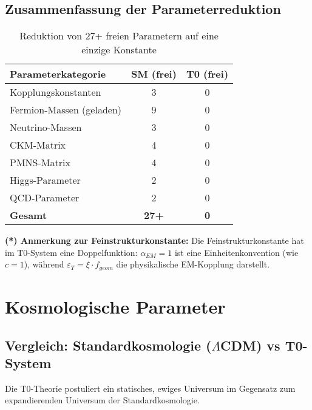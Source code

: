 \documentclass[12pt,a4paper]{article}
\begin{document}
	\subsection{Zusammenfassung der Parameterreduktion}
	
	\begin{table}[H]
		\centering
		\begin{tabular}{lcc}
			\toprule
			\textbf{Parameterkategorie} & \textbf{SM (frei)} & \textbf{T0 (frei)} \\
			\midrule
			Kopplungskonstanten & 3 & 0 \\
			Fermion-Massen (geladen) & 9 & 0 \\
			Neutrino-Massen & 3 & 0 \\
			CKM-Matrix & 4 & 0 \\
			PMNS-Matrix & 4 & 0 \\
			Higgs-Parameter & 2 & 0 \\
			QCD-Parameter & 2 & 0 \\
			\midrule
			\textbf{Gesamt} & \textbf{27+} & \textbf{0} \\
			\bottomrule
		\end{tabular}
		\caption{Reduktion von 27+ freien Parametern auf eine einzige Konstante}
	\end{table}
	
	\textbf{(*) Anmerkung zur Feinstrukturkonstante:}
	Die Feinstrukturkonstante hat im T0-System eine Doppelfunktion: $\alpha_{EM} = 1$ ist eine Einheitenkonvention (wie $c = 1$), während $\varepsilon_T = \xi \cdot f_{geom}$ die physikalische EM-Kopplung darstellt.
	
	\section{Kosmologische Parameter}
	
	\subsection{Vergleich: Standardkosmologie ($\Lambda$CDM) vs T0-System}
	
	Die T0-Theorie postuliert ein statisches, ewiges Universum im Gegensatz zum expandierenden Universum der Standardkosmologie.
	
\end{document}

